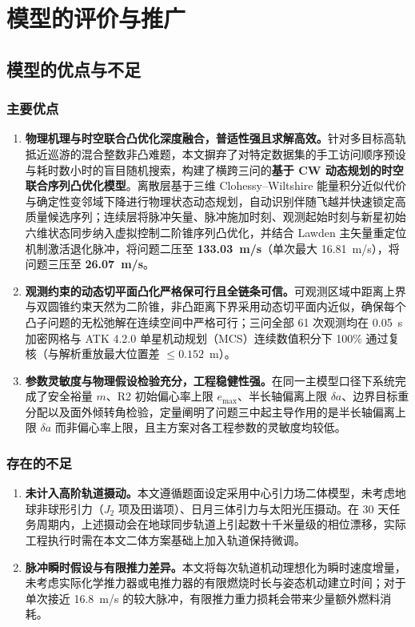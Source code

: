 \section{模型的评价与推广}

\subsection{模型的优点与不足}

\subsubsection{主要优点}

\begin{enumerate}
  \item \textbf{物理机理与时空联合凸优化深度融合，普适性强且求解高效。}针对多目标高轨抵近巡游的混合整数非凸难题，本文摒弃了对特定数据集的手工访问顺序预设与耗时数小时的盲目随机搜索，构建了横跨三问的\textbf{基于 CW 动态规划的时空联合序列凸优化模型}。离散层基于三维 Clohessy--Wiltshire 能量积分近似代价与确定性变邻域下降进行物理状态动态规划，自动识别伴随飞越并快速锁定高质量候选序列；连续层将脉冲矢量、脉冲施加时刻、观测起始时刻与新星初始六维状态同步纳入虚拟控制二阶锥序列凸优化，并结合 Lawden 主矢量\cite{lawden1963}重定位机制激活退化脉冲，将问题二压至 \textbf{133.03~m/s}（单次最大 16.81~m/s），将问题三压至 \textbf{26.07~m/s}。
  \item \textbf{观测约束的动态切平面凸化严格保可行且全链条可信。}可观测区域中距离上界与双圆锥约束天然为二阶锥，非凸距离下界采用动态切平面内近似，确保每个凸子问题的无松弛解在连续空间中严格可行；三问全部 61 次观测均在 0.05~s 加密网格与 ATK 4.2.0 单星机动规划（MCS）连续数值积分下 100\% 通过复核（与解析重放最大位置差 $\le 0.152$~m）。
  \item \textbf{参数灵敏度与物理假设检验充分，工程稳健性强。}在同一主模型口径下系统完成了安全裕量 $m$、R2 初始偏心率上限 $e_{\max}$、半长轴偏离上限 $\delta a$、边界目标重分配以及面外倾转角检验，定量阐明了问题三中起主导作用的是半长轴偏离上限 $\delta a$ 而非偏心率上限，且主方案对各工程参数的灵敏度均较低。
\end{enumerate}

\subsubsection{存在的不足}

\begin{enumerate}
  \item \textbf{未计入高阶轨道摄动。}本文遵循题面设定采用中心引力场二体模型，未考虑地球非球形引力（$J_2$ 项及田谐项）、日月三体引力与太阳光压摄动。在 30 天任务周期内，上述摄动会在地球同步轨道上引起数十千米量级的相位漂移，实际工程执行时需在本文二体方案基础上加入轨道保持微调。
  \item \textbf{脉冲瞬时假设与有限推力差异。}本文将每次轨道机动理想化为瞬时速度增量，未考虑实际化学推力器或电推力器的有限燃烧时长与姿态机动建立时间；对于单次接近 16.8~m/s 的较大脉冲，有限推力重力损耗会带来少量额外燃料消耗。
\end{enumerate}

